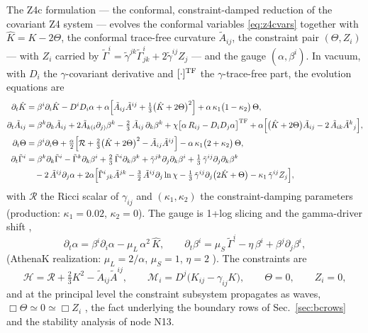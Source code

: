 The Z4c formulation \cite{Bernuzzi:2009ex,Hilditch:2012fp} --- the
conformal, constraint-damped reduction of the covariant Z4 system
\cite{Bona:2003fj} --- evolves the
conformal variables \eqref{eq:z4cvars} together with
$\hat K = K - 2\Theta$, the conformal trace-free curvature
$\tilde A_{ij}$, the constraint pair $(\Theta, Z_i)$ --- with $Z_i$
carried by $\tilde\Gamma^i = \tilde\gamma^{jk}\tilde\Gamma^i_{jk}
 + 2\tilde\gamma^{ij}Z_j$ --- and the gauge $(\alpha,\beta^i)$. In
vacuum, with $D_i$ the $\gamma$-covariant derivative and
$[\cdot]^{\rm TF}$ the $\gamma$-trace-free part, the evolution equations
are \cite{Bernuzzi:2009ex}
\begin{align}
\partial_t \hat K &= \beta^i\partial_i\hat K - D^iD_i\alpha
 + \alpha\Big[\tilde A_{ij}\tilde A^{ij}
 + \tfrac13\big(\hat K + 2\Theta\big)^2\Big]
 + \alpha\,\kappa_1\big(1-\kappa_2\big)\,\Theta,
\label{eq:dtKhat}\\
\partial_t \tilde A_{ij} &= \beta^k\partial_k\tilde A_{ij}
 + 2\tilde A_{k(i}\partial_{j)}\beta^k
 - \tfrac23\,\tilde A_{ij}\,\partial_k\beta^k
 + \chi\big[\alpha\,R_{ij} - D_iD_j\alpha\big]^{\rm TF}
 + \alpha\Big[\big(\hat K + 2\Theta\big)\tilde A_{ij}
 - 2\,\tilde A_{ik}\tilde A^k{}_j\Big],
\label{eq:dtAt}\\
\partial_t \Theta &= \beta^i\partial_i\Theta
 + \tfrac{\alpha}{2}\Big[\mathcal R + \tfrac23\big(\hat K+2\Theta\big)^2
 - \tilde A_{ij}\tilde A^{ij}\Big]
 - \alpha\,\kappa_1\big(2+\kappa_2\big)\,\Theta,
\label{eq:dtTheta}\\
\partial_t \tilde\Gamma^i &= \beta^k\partial_k\tilde\Gamma^i
 - \tilde\Gamma^k\partial_k\beta^i
 + \tfrac23\,\tilde\Gamma^i\partial_k\beta^k
 + \tilde\gamma^{jk}\partial_j\partial_k\beta^i
 + \tfrac13\,\tilde\gamma^{ij}\partial_j\partial_k\beta^k
 \nonumber\\&\quad
 - 2\,\tilde A^{ij}\partial_j\alpha
 + 2\alpha\Big[\tilde\Gamma^i{}_{jk}\tilde A^{jk}
 - \tfrac32\,\tilde A^{ij}\partial_j\ln\chi
 - \tfrac13\,\tilde\gamma^{ij}\partial_j\big(2\hat K+\Theta\big)
 - \kappa_1\,\tilde\gamma^{ij}Z_j\Big],
\label{eq:dtGam}
\end{align}
with $\mathcal R$ the Ricci scalar of $\gamma_{ij}$ and
$(\kappa_1,\kappa_2)$ the constraint-damping parameters (production:
$\kappa_1 = 0.02$, $\kappa_2 = 0$). The gauge is 1+log slicing and the
gamma-driver shift \cite{Bernuzzi:2009ex,Zhu:2024utz},
\begin{equation}
\partial_t\alpha = \beta^i\partial_i\alpha
 - \mu_L\,\alpha^2\,\hat K,
\qquad
\partial_t\beta^i = \mu_S\,\tilde\Gamma^i - \eta\,\beta^i
 + \beta^j\partial_j\beta^i,
\label{eq:gauge}
\end{equation}
(AthenaK realization: $\mu_L = 2/\alpha$, $\mu_S = 1$, $\eta = 2$
\cite{Zhu:2024utz}). The constraints are
\begin{equation}
\mathcal H = \mathcal R + \tfrac23 K^2 - \tilde A_{ij}\tilde A^{ij},
\qquad
\mathcal M_i = D^j\big(K_{ij} - \gamma_{ij}K\big),
\qquad
\Theta = 0,\qquad Z_i = 0,
\label{eq:constraints}
\end{equation}
and at the principal level the constraint subsystem propagates as waves,
$\Box\Theta \simeq 0 \simeq \Box Z_i$ \cite{Ruiz:2010qj}, the fact
underlying the boundary rows of Sec.~\ref{sec:bcrows} and the stability
analysis of node N13.


